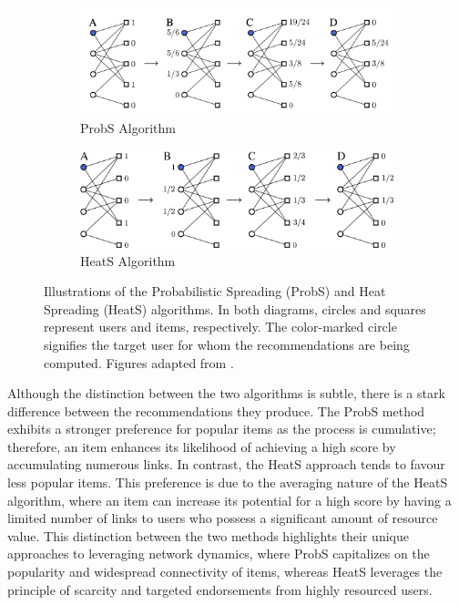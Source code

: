 \documentclass[12pt]{article}
\numberwithin{equation}{section}
\begin{document}
\begin{figure}[!ht]
\centering
\begin{subfigure}[b]{0.45\textwidth}
    \includegraphics[width=\textwidth]{Prob S algorithm}
    \caption{ProbS Algorithm}
    \label{subfig:prob_s}
\end{subfigure}
\hfill %
\begin{subfigure}[b]{0.45\textwidth}
    \includegraphics[width=\textwidth]{Heat S.jpg}
    \caption{HeatS Algorithm}
    \label{subfig:heat_s}
\end{subfigure}
\caption{Illustrations of the Probabilistic Spreading (ProbS) and Heat Spreading (HeatS) algorithms. In both diagrams, circles and squares represent users and items, respectively. The color-marked circle signifies the target user for whom the recommendations are being computed. Figures adapted from \cite{prob_s}.}
\label{fig:algorithms}
\end{figure}

Although the distinction between the two algorithms is subtle, there is a stark difference between the recommendations they produce. The ProbS method exhibits a stronger preference for popular items as the process is cumulative; therefore, an item enhances its likelihood of achieving a high score by accumulating numerous links. In contrast, the HeatS approach tends to favour less popular items. This preference is due to the averaging nature of the HeatS algorithm, where an item can increase its potential for a high score by having a limited number of links to users who possess a significant amount of resource value. This distinction between the two methods highlights their unique approaches to leveraging network dynamics, where ProbS capitalizes on the popularity and widespread connectivity of items, whereas HeatS leverages the principle of scarcity and targeted endorsements from highly resourced users.
\end{document}
